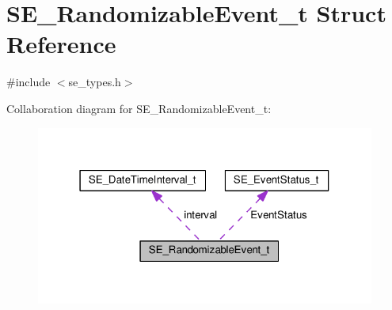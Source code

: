 \hypertarget{structSE__RandomizableEvent__t}{}\section{S\+E\+\_\+\+Randomizable\+Event\+\_\+t Struct Reference}
\label{structSE__RandomizableEvent__t}


{\ttfamily \#include $<$se\+\_\+types.\+h$>$}



Collaboration diagram for S\+E\+\_\+\+Randomizable\+Event\+\_\+t\+:\nopagebreak
\begin{figure}[H]
\begin{center}
\leavevmode
\includegraphics[width=316pt]{structSE__RandomizableEvent__t__coll__graph}
\end{center}
\end{figure}

